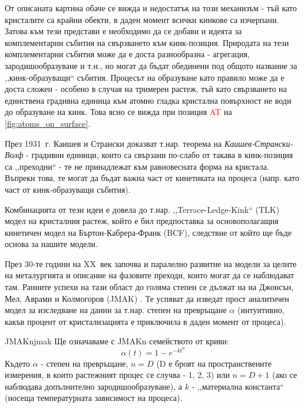 От описаната картина обаче се вижда и недостатък на този механизъм - тъй като кристалите са крайни обекти, в даден момент всички кинкове са изчерпани. Затова към тези представи е необходимо да се добави и идеята за комплементарни събития на свързването към кинк-позиция. Природата на тези комплементарни събития може да е доста разнообразна - агрегация, зародишообразуване и т.н., но могат да бъдат обединени под общото название за ,,кинк-образуващи`` събития.
Процесът на образуване като правило може да е доста сложен - особено в случая на тримерен растеж, тъй като свързването на единствена градивна единица към атомно гладка кристална повърхност не води до образуване на кинк. Това ясно се вижда при позиция \textcolor{red}{AT} на \autoref{fig:atoms_on_surface}.

През 1931~г. Каишев и Странски доказват т.нар. теорема на \textit{Каишев-Странски-Волф} - градивни единици, които са свързани по-слабо от такава в кинк-позиция са ,,преходни`` - те не принадлежат към равновесната форма на кристала. Въпреки това, те могат да бъдат важна част от кинетиката на процеса (напр. като част от кинк-образуващи събития). \cite{StranskiKaischew1931}\cite{Yamamoto1988}

Комбинацията от тези идеи е довела до т.нар. ,,Terrace-Ledge-Kink`` (TLK) модел на кристалния растеж, който е бил предпоставка за основополагащия кинетичен модел на Бъртон-Кабрера-Франк (BCF), следствие от който ще бъде основа за нашите модели. \cite{BCF1951}\cite{Chernov2004}

През 30-те години на XX~век започва и паралелно развитие на модели за целите на металургията и описание на фазовите преходи, които могат да се наблюдават там. Ранните успехи на тази област до голяма степен се дължат на на Джонсън, Мел, Аврами и Колмогоров (JMAK) \cite{Mehl1939} \cite{Lambrigger1998}. Те успяват да изведат прост аналитичен модел за изследване на данни за т.нар. степен на превръщане $\alpha$ (интуитивно, какъв процент от кристализацията е приключила в даден момент от процеса).

\begin{result}{JMAKn}{jmak}
    Ще означаваме с JMAKn семейството от криви:
    \begin{equation}
        \label{eq:jmak}
        \alpha(t) = 1 - e^{ - k t^n }
    \end{equation}
    Където $\alpha$ - степен на превръщане, $n = D$ (D е броят на пространствените измерения, в които растежният процес се случва - 1, 2, 3) или $n = D+1$ (ако се наблюдава допълнително зародишообразуване), а $k$ - ,,материална константа`` (носеща температурната зависимост на процеса).
\end{result}

